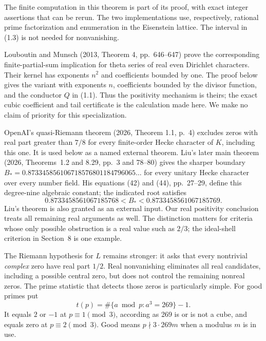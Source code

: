 \documentclass[11pt]{article}
\begin{document}
The finite computation in this theorem is part of its proof, with exact integer assertions that can be rerun. The two implementations use, respectively, rational prime factorization and enumeration in the Eisenstein lattice. The interval in (1.3) is not needed for nonvanishing.

Louboutin and Munsch (2013, Theorem 4, pp.~646--647) prove the corresponding finite-partial-sum implication for theta series of real even Dirichlet characters. Their kernel has exponents $n^2$ and coefficients bounded by one. The proof below gives the variant with exponents $n$, coefficients bounded by the divisor function, and the conductor $Q$ in (1.1). Thus the positivity mechanism is theirs; the exact cubic coefficient and tail certificate is the calculation made here. We make no claim of priority for this specialization.

OpenAI's quasi-Riemann theorem (2026, Theorem 1.1, p.~4) excludes zeros with real part greater than $7/8$ for every finite-order Hecke character of $K$, including this one. It is used below as a named external theorem. Liu's later main theorem (2026, Theorems~1.2 and 8.29, pp.~3 and 78--80) gives the sharper boundary $B_*=0.873345856106718576801184796065\ldots$ for every unitary Hecke character over every number field. His equations (42) and (44), pp.~27--29, define this degree-nine algebraic constant; the indicated root satisfies
\[
 0.8733458561067185768<B_*<0.8733458561067185769.
\]
Liu's theorem is also granted as an external input. Our real positivity conclusion treats all remaining real arguments as well. The distinction matters for criteria whose only possible obstruction is a real value such as $2/3$; the ideal-shell criterion in Section~8 is one example.

The Riemann hypothesis for $L$ remains stronger: it asks that every nontrivial \emph{complex} zero have real part $1/2$. Real nonvanishing eliminates all real candidates, including a possible central zero, but does not control the remaining nonreal zeros. The prime statistic that detects those zeros is particularly simple. For good primes put
\[
 t(p)=\#\{a\bmod p:a^3=269\}-1.
 \tag{1.4}
\]
It equals $2$ or $-1$ at $p\equiv1\pmod3$, according as 269 is or is not a cube, and equals zero at $p\equiv2\pmod3$. Good means $p\nmid3\cdot269m$ when a modulus $m$ is in use.
\end{document}
